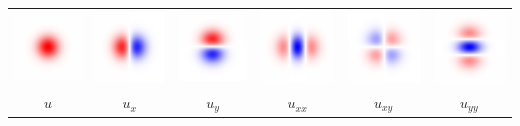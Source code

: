 \begin{tabular}{cccccc}
\includegraphics{fgauss.png} &
\includegraphics{fgaussx.png} &
\includegraphics{fgaussy.png} &
\includegraphics{fgaussxx.png} &
\includegraphics{fgaussxy.png} &
\includegraphics{fgaussyy.png} \\
$u$ & $u_x$ & $u_y$ & $u_{xx}$ & $u_{xy}$ & $u_{yy}$
\end{tabular}
